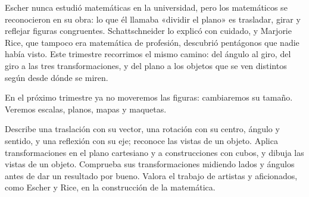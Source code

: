 \documentclass[11pt]{article}
\begin{document}

Escher nunca estudió matemáticas en la universidad, pero los matemáticos se reconocieron en su
obra: lo que él llamaba «dividir el plano» es trasladar, girar y reflejar figuras congruentes.
Schattschneider lo explicó con cuidado, y Marjorie Rice, que tampoco era matemática de
profesión, descubrió pentágonos que nadie había visto. Este trimestre recorrimos el mismo camino:
del ángulo al giro, del giro a las tres transformaciones, y del plano a los objetos que se ven
distintos según desde dónde se miren.

En el próximo trimestre ya no moveremos las figuras: cambiaremos su tamaño. Veremos escalas,
planos, mapas y maquetas.

\matrizevaluacion
  {Describe una traslación con su vector, una rotación con su centro, ángulo y sentido, y una reflexión con su eje; reconoce las vistas de un objeto.}
  {Aplica transformaciones en el plano cartesiano y a construcciones con cubos, y dibuja las vistas de un objeto.}
  {Comprueba sus transformaciones midiendo lados y ángulos antes de dar un resultado por bueno.}
  {Valora el trabajo de artistas y aficionados, como Escher y Rice, en la construcción de la matemática.}

\autoevaluacion

\seguimientodocente
\end{document}
